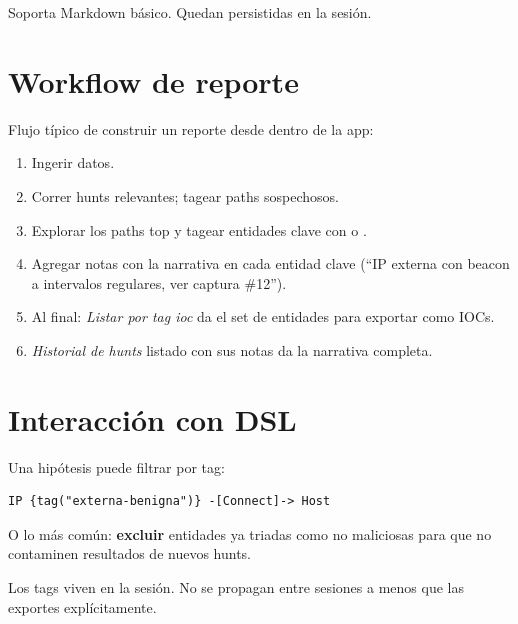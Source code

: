 Soporta Markdown básico. Quedan persistidas en la sesión.

\section{Workflow de reporte}

Flujo típico de construir un reporte desde dentro de la app:

\begin{enumerate}
    \item Ingerir datos.
    \item Correr hunts relevantes; tagear paths sospechosos.
    \item Explorar los paths top y tagear entidades clave con
     o .
    \item Agregar notas con la narrativa en cada entidad clave
    (``IP externa con beacon a intervalos regulares, ver captura
    \#12'').
    \item Al final: \emph{Listar por tag \textrightarrow{} ioc}
    da el set de entidades para exportar como IOCs.
    \item \emph{Historial de hunts} listado con sus notas da la
    narrativa completa.
\end{enumerate}

\section{Interacción con DSL}

Una hipótesis puede filtrar por tag:

\begin{lstlisting}[basicstyle=\ttfamily\small]
IP {tag("externa-benigna")} -[Connect]-> Host
\end{lstlisting}

O lo más común: \textbf{excluir} entidades ya triadas como no
maliciosas para que no contaminen resultados de nuevos hunts.

Los tags viven en la sesión. No se propagan entre sesiones a menos
que las exportes explícitamente.
